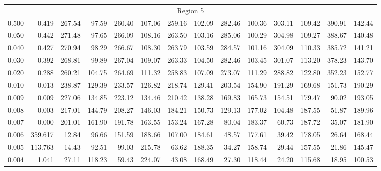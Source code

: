 \begin{tabular}{@{}lrrrrrrrrrrrrr@{}}
\midrule
\multicolumn{14}{c}{Region 5} \\
\cmidrule{1-14}
0.500 & 0.419 & 267.54 & 97.59 & 260.40 & 107.06 & 259.16 & 102.09 & 282.46 & 100.36 & 303.11 & 109.42 & 390.91 & 142.44 \\
0.050 & 0.442 & 271.48 & 97.65 & 266.09 & 108.16 & 263.50 & 103.16 & 285.06 & 100.29 & 304.98 & 109.27 & 388.67 & 140.48 \\
0.040 & 0.427 & 270.94 & 98.29 & 266.67 & 108.30 & 263.79 & 103.59 & 284.57 & 101.16 & 304.09 & 110.33 & 385.72 & 141.21 \\
0.030 & 0.392 & 268.81 & 99.89 & 267.04 & 109.07 & 263.33 & 104.50 & 282.46 & 103.45 & 301.07 & 113.20 & 378.23 & 143.70 \\
0.020 & 0.288 & 260.21 & 104.75 & 264.69 & 111.32 & 258.83 & 107.09 & 273.07 & 111.29 & 288.82 & 122.80 & 352.23 & 152.77 \\
0.010 & 0.013 & 238.87 & 129.39 & 233.57 & 126.82 & 218.74 & 129.41 & 203.54 & 154.90 & 191.29 & 169.68 & 151.73 & 190.29 \\
0.009 & 0.009 & 227.06 & 134.85 & 223.12 & 134.46 & 210.42 & 138.28 & 169.83 & 165.73 & 154.51 & 179.47 & 90.02 & 193.05 \\
0.008 & 0.003 & 217.01 & 144.79 & 208.27 & 146.03 & 184.21 & 150.73 & 129.13 & 177.02 & 104.48 & 187.55 & 51.87 & 189.96 \\
0.007 & 0.000 & 201.01 & 161.90 & 191.78 & 163.55 & 153.24 & 167.28 & 80.04 & 183.37 & 60.73 & 187.72 & 35.07 & 181.90 \\
0.006 & 359.617 & 12.84 & 96.66 & 151.59 & 188.66 & 107.00 & 184.61 & 48.57 & 177.61 & 39.42 & 178.05 & 26.64 & 168.44 \\
0.005 & 113.763 & 14.43 & 92.51 & 99.03 & 215.78 & 63.62 & 188.35 & 34.27 & 158.74 & 29.44 & 157.55 & 21.86 & 145.47 \\
0.004 & 1.041 & 27.11 & 118.23 & 59.43 & 224.07 & 43.08 & 168.49 & 27.30 & 118.44 & 24.20 & 115.68 & 18.95 & 100.53 \\


\end{tabular}
